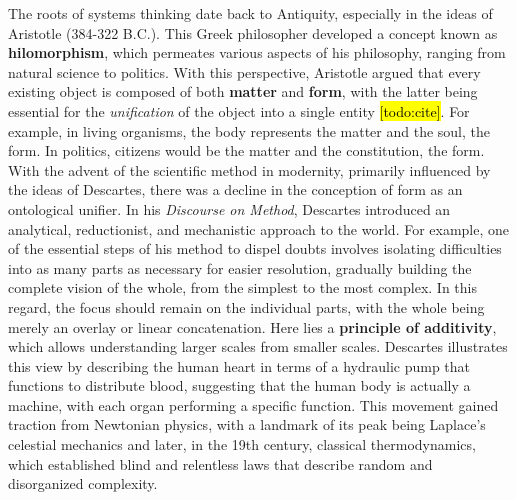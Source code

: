 \documentclass[./main_en.tex]{subfiles}
\begin{document}
\par The roots of systems thinking date back to Antiquity, especially in the ideas of Aristotle (384-322 B.C.). This Greek philosopher developed a concept known as \textbf{\gls{hilomorphism}}, which permeates various aspects of his philosophy, ranging from natural science to politics. With this perspective, Aristotle argued that every existing object is composed of both \textbf{matter} and \textbf{form}, with the latter being essential for the \textit{unification} of the object into a single entity \hl{[todo:cite]}. For example, in living organisms, the body represents the matter and the soul, the form. In politics, citizens would be the matter and the constitution, the form. With the advent of the scientific method in modernity, primarily influenced by the ideas of Descartes, there was a decline in the conception of form as an ontological unifier. In his \textit{Discourse on Method}, Descartes introduced an analytical, reductionist, and mechanistic approach to the world. For example, one of the essential steps of his method to dispel doubts involves isolating difficulties into as many parts as necessary for easier resolution, gradually building the complete vision of the whole, from the simplest to the most complex. In this regard, the focus should remain on the individual parts, with the whole being merely an overlay or linear concatenation. Here lies a \textbf{principle of additivity}, which allows understanding larger scales from smaller scales. Descartes illustrates this view by describing the human heart in terms of a hydraulic pump that functions to distribute blood, suggesting that the human body is actually a machine, with each organ performing a specific function. This movement gained traction from Newtonian physics, with a landmark of its peak being Laplace's celestial mechanics and later, in the 19th century, classical thermodynamics, which established blind and relentless laws that describe random and disorganized complexity.
\end{document}

